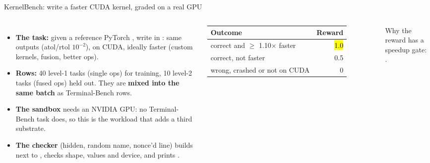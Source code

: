 \begin{frame}{KernelBench: write a faster CUDA kernel, graded on a real GPU}
\begin{columns}[T]
\begin{itemize}\footnotesize\setlength{\itemsep}{1.2mm}
\item \textbf{The task:} given a reference PyTorch , write  in : same
  outputs (atol/rtol $10^{-2}$), on CUDA, ideally faster (custom kernels, fusion, better ops).
\item \textbf{Rows:} 40 level-1 tasks (single ops) for training, 10 level-2 tasks (fused ops) held out.
  They are \textbf{mixed into the same batch} as Terminal-Bench rows.
\item \textbf{The sandbox} needs an NVIDIA GPU: no Terminal-Bench task does, so this is the workload that
  adds a third substrate.
\item \textbf{The checker} (hidden, random name, nonce'd  line) builds  next to
  , checks shape, values and device, and prints .
\end{itemize}
\footnotesize\setlength{\tabcolsep}{4pt}
\begin{tabular}{@{}l r@{}}
\toprule
\textbf{Outcome} & \textbf{Reward}\\
\midrule
correct and $\ge$ 1.10$\times$ faster & \hl{1.0}\\
correct, not faster & 0.5\\
wrong, crashed or not on CUDA & 0\\
\bottomrule
\end{tabular}
\par\vspace{2mm}
{\scriptsize Why the reward has a speedup gate: .}
\end{columns}
\end{frame}

